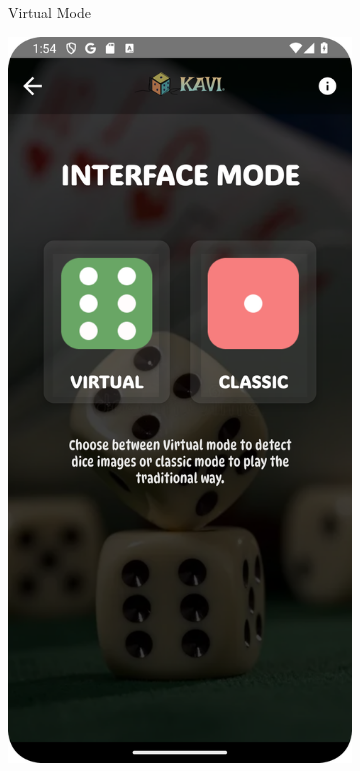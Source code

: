 \begin{figure}[ht!]
\begin{subfigure}[b]{0.27\textwidth}
        \caption{Virtual Mode}
        \label{fig:virtual_mode}
    \end{subfigure}
    \hfill
    \begin{subfigure}[b]{0.27\textwidth}
        \includegraphics[width=\textwidth]{img/interface mode.png}

\end{subfigure}
\end{figure}
